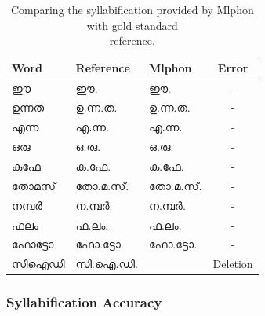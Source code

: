 \begin{table}[ht]
	\begin{center}
		\caption{Comparing the syllabification provided by Mlphon with gold standard \\reference.}
		\label{tab:goldsyl}
		\begin{center}
			\begin{tabular}{lllc}
				\hline \hline
				Word        & Reference      & Mlphon         & Error      \\ \hline
				{\mal ഈ}    & {\mal ഈ.}      & {\mal ഈ.}      & {-}        \\
				{\mal ഉന്നത} & {\mal ഉ.ന്ന.ത.} & {\mal ഉ.ന്ന.ത.} & {- }       \\
				{\mal എന്ന}  & {\mal എ.ന്ന.}   & {\mal എ.ന്ന.}   & {- }       \\
				{\mal  ഒരു}  & {\mal  ഒ.രു.}   & {\mal  ഒ.രു.}   & -          \\
				{\mal കഫേ}   & {\mal ക.ഫേ.}    & {\mal ക.ഫേ.}    & -          \\
				{\mal തോമസ്}  & {\mal തോ.മ.സ്.}  & {\mal തോ.മ.സ്.}  & -          \\
				{\mal നമ്പർ} & {\mal ന.മ്പർ.}  & {\mal ന.മ്പർ.}  & -          \\
				{\mal ഫലം}   & {\mal ഫ.ലം.}    & {\mal ഫ.ലം.}    & -          \\
				{\mal ഫോട്ടോ}  & {\mal ഫോ.ട്ടോ.}   & {\mal ഫോ.ട്ടോ.}   & -          \\

				{\mal സിഐഡി}  & {\mal സി.ഐ.ഡി. } & {\mal }        & {Deletion} \\ \hline
			\end{tabular}
		\end{center}

	\end{center}
\end{table}

\subsubsection{Syllabification Accuracy}

